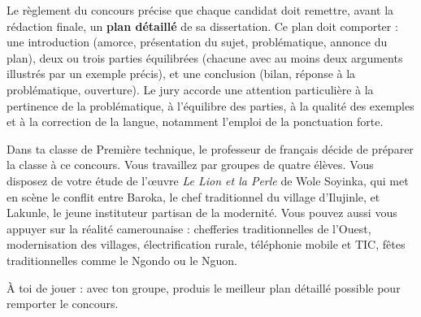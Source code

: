\documentclass[11pt]{article}
\newcounter{popsec}
\newcounter{popsub}
\newcommand{\courssub}[1]{%
  \stepcounter{popsub}%
  \par\vspace{9pt}\noindent{\popxbold\fontsize{11.5}{13}\selectfont\color{popink}{\color{poporange}\thepopsec.\thepopsub}\hspace{6pt}#1}\par\nopagebreak\vspace{4pt}
}
\begin{document}
Le règlement du concours précise que chaque candidat doit remettre, avant la rédaction finale, un \textbf{plan détaillé} de sa dissertation. Ce plan doit comporter : une introduction (amorce, présentation du sujet, problématique, annonce du plan), deux ou trois parties équilibrées (chacune avec au moins deux arguments illustrés par un exemple précis), et une conclusion (bilan, réponse à la problématique, ouverture). Le jury accorde une attention particulière à la pertinence de la problématique, à l'équilibre des parties, à la qualité des exemples et à la correction de la langue, notamment l'emploi de la ponctuation forte.

Dans ta classe de Première technique, le professeur de français décide de préparer la classe à ce concours. Vous travaillez par groupes de quatre élèves. Vous disposez de votre étude de l'œuvre \emph{Le Lion et la Perle} de Wole Soyinka, qui met en scène le conflit entre Baroka, le chef traditionnel du village d'Ilujinle, et Lakunle, le jeune instituteur partisan de la modernité. Vous pouvez aussi vous appuyer sur la réalité camerounaise : chefferies traditionnelles de l'Ouest, modernisation des villages, électrification rurale, téléphonie mobile et TIC, fêtes traditionnelles comme le Ngondo ou le Nguon.

À toi de jouer : avec ton groupe, produis le meilleur plan détaillé possible pour remporter le concours.

\courssub{Consignes}
\end{document}
